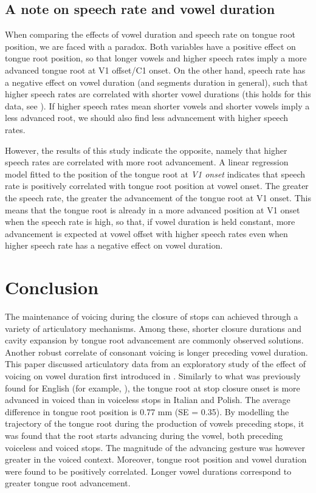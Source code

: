 \documentclass[preprint]{JASAnew}
\begin{document}
\hypertarget{a-note-on-speech-rate-and-vowel-duration}{%
\subsection{A note on speech rate and vowel
duration}\label{a-note-on-speech-rate-and-vowel-duration}}

When comparing the effects of vowel duration and speech rate on tongue
root position, we are faced with a paradox. Both variables have a
positive effect on tongue root position, so that longer vowels and
higher speech rates imply a more advanced tongue root at V1 offset/C1
onset. On the other hand, speech rate has a negative effect on vowel
duration (and segments duration in general), such that higher speech
rates are correlated with shorter vowel durations (this holds for this
data, see \citealt{coretta2019k}). If higher speech rates mean shorter
vowels and shorter vowels imply a less advanced root, we should also
find less advancement with higher speech rates.

However, the results of this study indicate the opposite, namely that
higher speech rates are correlated with more root advancement. A linear
regression model fitted to the position of the tongue root at \emph{V1
onset} indicates that speech rate is positively correlated with tongue
root position at vowel onset. The greater the speech rate, the greater
the advancement of the tongue root at V1 onset. This means that the
tongue root is already in a more advanced position at V1 onset when the
speech rate is high, so that, if vowel duration is held constant, more
advancement is expected at vowel offset with higher speech rates even
when higher speech rate has a negative effect on vowel duration.

\hypertarget{conclusion}{%
\section{Conclusion}\label{conclusion}}

The maintenance of voicing during the closure of stops can achieved
through a variety of articulatory mechanisms. Among these, shorter
closure durations \citep{davis1989} and cavity expansion by tongue root
advancement \citep{westbury1983} are commonly observed solutions.
Another robust correlate of consonant voicing is longer preceding vowel
duration. This paper discussed articulatory data from an exploratory
study of the effect of voicing on vowel duration first introduced in
\citet{coretta2019k}. Similarly to what was previously found for English
(for example, \citealt{westbury1983, ahn2018}), the tongue root at stop
closure onset is more advanced in voiced than in voiceless stops in
Italian and Polish. The average difference in tongue root position is
0.77 mm (SE = 0.35). By modelling the trajectory of the tongue root
during the production of vowels preceding stops, it was found that the
root starts advancing during the vowel, both preceding voiceless and
voiced stops. The magnitude of the advancing gesture was however greater
in the voiced context. Moreover, tongue root position and vowel duration
were found to be positively correlated. Longer vowel durations
correspond to greater tongue root advancement.
\end{document}
